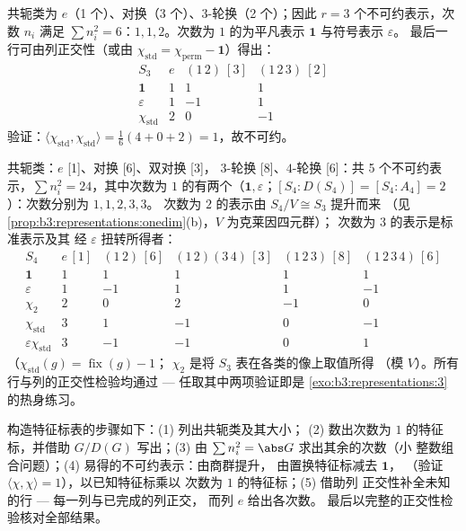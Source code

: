 \begin{example}[$S_3$ 的特征标表]\label{ex:b3:representations:s3}
共轭类为 $e$（1 个）、对换（3 个）、$3$-轮换（2 个）；因此 $r
= 3$ 个不可约表示，次数 $n_i$ 满足 $\sum n_i^2 = 6$：$1, 1,
2$。次数为 $1$ 的为平凡表示 $\mathbf 1$ 与符号表示 $\varepsilon$。
最后一行可由列正交性（或由
$\chi_{\mathrm{std}} = \chi_{\mathrm{perm}} - \mathbf 1$）得出：
\[
\begin{array}{c|ccc}
S_3 & e & (1\,2)\ [3] & (1\,2\,3)\ [2]\\
\hline
\mathbf 1 & 1 & 1 & 1\\
\varepsilon & 1 & -1 & 1\\
\chi_{\mathrm{std}} & 2 & 0 & -1
\end{array}
\]
验证：$\langle\chi_{\mathrm{std}},\chi_{\mathrm{std}}\rangle =
\frac{1}{6}(4 + 0 + 2) = 1$，故不可约。
\end{example}

\begin{example}[$S_4$ 的特征标表]\label{ex:b3:representations:s4}
共轭类：$e$ [1]、对换 [6]、双对换 [3]，
$3$-轮换 [8]、$4$-轮换 [6]：共 5 个不可约表示，$\sum n_i^2 =
24$，其中次数为 $1$ 的有两个（$\mathbf 1, \varepsilon$；$[S_4 :
D(S_4)] = [S_4 : A_4] = 2$）：次数分别为 $1, 1, 2, 3, 3$。
次数为 $2$ 的表示由 $S_4/V \cong S_3$ 提升而来
（见\cref{prop:b3:representations:onedim}(b)，$V$ 为克莱因四元群）；
次数为 $3$ 的表示是标准表示及其
经 $\varepsilon$ 扭转所得者：
\[
\begin{array}{c|ccccc}
S_4 & e\,[1] & (1\,2)\,[6] & (1\,2)(3\,4)\,[3] &
(1\,2\,3)\,[8] & (1\,2\,3\,4)\,[6]\\
\hline
\mathbf 1 & 1 & 1 & 1 & 1 & 1\\
\varepsilon & 1 & -1 & 1 & 1 & -1\\
\chi_2 & 2 & 0 & 2 & -1 & 0\\
\chi_{\mathrm{std}} & 3 & 1 & -1 & 0 & -1\\
\varepsilon\chi_{\mathrm{std}} & 3 & -1 & -1 & 0 & 1
\end{array}
\]
（$\chi_{\mathrm{std}}(g) = \operatorname{fix}(g) - 1$；
$\chi_2$ 是将 $S_3$ 表在各类的像上取值所得
（模 $V$）。所有行与列的正交性检验均通过 ---
任取其中两项验证即是 \cref{exo:b3:representations:3} 的热身练习。
\end{example}

\begin{method}\label{met:b3:representations:table}
构造特征标表的步骤如下：(1) 列出共轭类及其大小；
(2) 数出次数为 $1$ 的特征标，并借助 $G/D(G)$ 写出；(3)
由 $\sum n_i^2 = \abs G$ 求出其余的次数（小
整数组合问题）；(4) 易得的不可约表示：由商群提升，
由置换特征标减去 $\mathbf 1$，
（验证 $\langle\chi,\chi\rangle = 1$），以已知特征标乘以
次数为 $1$ 的特征标；(5) 借助列
正交性补全未知的行 --- 每一列与已完成的列正交，
而列 $e$ 给出各次数。
最后以完整的正交性检验核对全部结果。
\end{method}

